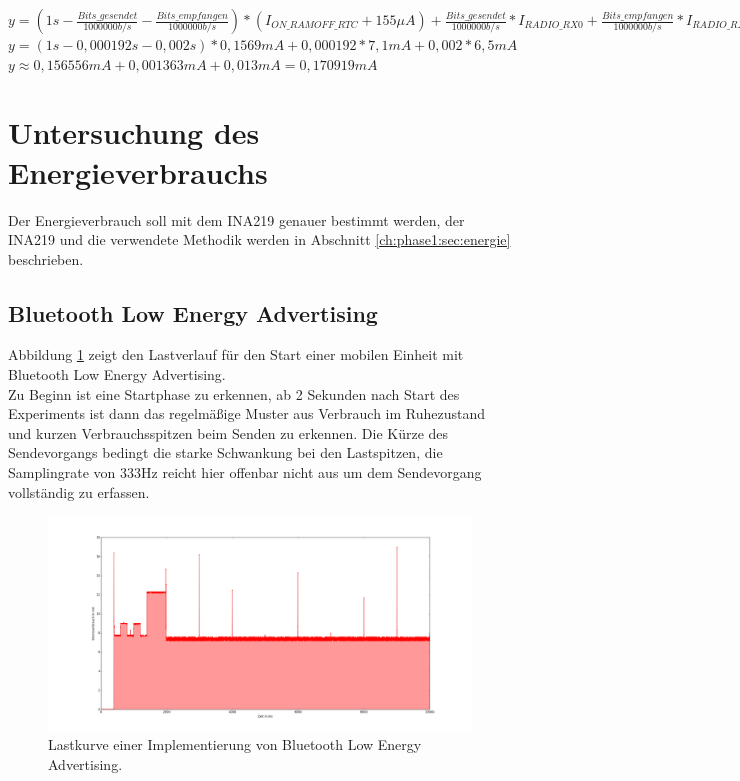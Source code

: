 $y = (1s-\frac{Bits\_gesendet}{1000000 b/s} - \frac{Bits\_empfangen}{1000000 b/s}) * (I_{ON\_RAMOFF\_RTC} + 155 {\mu}A) + \frac{Bits\_gesendet}{1000000 b/s} * I_{RADIO\_RX0} + \frac{Bits\_empfangen}{1000000 b/s} * I_{RADIO\_RX0}$\\[0.5cm]
$y = (1s - 0,000192s - 0,002s) * 0,1569mA + 0,000192 * 7,1mA + 0,002 * 6,5mA$\\[0.5cm]
$y \approx 0,156556mA + 0,001363mA + 0,013mA = 0,170919mA$ \\[1cm]


\section{Untersuchung des Energieverbrauchs}
Der Energieverbrauch soll mit dem INA219 genauer bestimmt werden, der INA219 und die verwendete Methodik werden in Abschnitt \ref{ch:phase1:sec:energie} beschrieben.

\subsection{Bluetooth Low Energy Advertising}
\label{ch:phase3:sec:powerble}
Abbildung \ref{fig:blue} zeigt den Lastverlauf für den Start einer mobilen Einheit mit Bluetooth Low Energy Advertising.\\
Zu Beginn ist eine Startphase zu erkennen, ab 2 Sekunden nach Start des Experiments ist dann das regelmäßige Muster aus Verbrauch im Ruhezustand und kurzen Verbrauchsspitzen beim Senden zu erkennen.
Die Kürze des Sendevorgangs bedingt die starke Schwankung bei den Lastspitzen, die Samplingrate von 333Hz reicht hier offenbar nicht aus um dem Sendevorgang vollständig zu erfassen.\\

\begin{figure}[h!]
  \centering
	\includegraphics[width=\textwidth]{plots/blue.png}
  \caption{Lastkurve einer Implementierung von Bluetooth Low Energy Advertising.}
  \label{fig:blue}
\end{figure}

